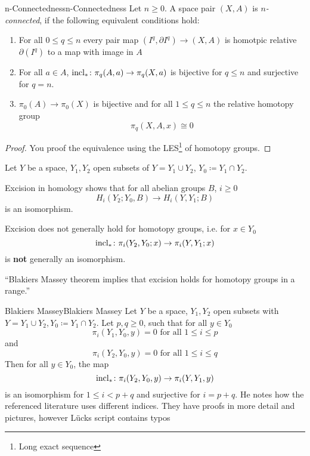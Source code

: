 \documentclass[language=english]{TemplateLecture}
\begin{document}
\begin{defi}{n-Connectedness}{n-Connectedness}
    Let \(n \geq 0\). A space pair \((X,A)\) is \emph{\(n\)-connected}, if the following equivalent conditions hold:
    \begin{enumerate}
        \item For all \(0 \leq q\leq n\) every pair map \((I^q, \partial I^q) \to (X,A)\) is homotpic relative \(\partial(I^q)\) to a map with image in \(A\)
        \item For all \(a \in A\), \(\operatorname{incl}_*\colon \pi_q(A,a) \to \pi_q(X,a)\) is bijective for \(q \leq n\) and surjective for \(q = n\).
        \item \(\pi_0(A) \to \pi_0(X)\) is bijective and for all \(1 \leq q \leq n\) the relative homotopy group
        \[\pi_q(X,A,x) \cong 0\]
    \end{enumerate}
\end{defi}

\begin{proof}
    You proof the equivalence using the LES\footnote{Long exact sequence} of homotopy groups.
\end{proof}


Let \(Y\) be a space, \(Y_1, Y_2\) open subsets of \(Y = Y_1 \cup Y_2\), \(Y_0 \coloneq Y_1\cap Y_2\).

Excision in homology shows that for all abelian groups \(B\), \(i \geq 0\)
\[H_i(Y_2; Y_0, B) \to H_i(Y,Y_1; B)\]
is an isomorphism.

Excision does not generally hold for homotopy groups, i.e. for \(x \in Y_0\)
\[\operatorname{incl}_*\colon \pi_i(Y_2, Y_0; x) \to \pi_i(Y, Y_1; x)\]
is \textbf{not} generally an isomorphism.

\enquote {Blakiers Massey theorem implies that excision holds for homotopy groups in a range.}

\begin{thm}{Blakiers Massey}{Blakiers Massey}
    Let \(Y\) be a space, \(Y_1, Y_2\) open subsets with \(Y= Y_1 \cup Y_2, Y_0 \coloneq Y_1 \cap Y_2\). Let \(p, q \geq 0\), such that for all \(y \in Y_0\)
    \[\pi_i(Y_1, Y_0, y) = 0 \text{ for all } 1 \leq i \leq p\]
    and
    \[\pi_i(Y_2, Y_0, y) = 0 \text{ for all } 1 \leq i \leq q\]
    Then for all \(y \in Y_0\), the map
    \[\operatorname{incl}_*\colon \pi_i(Y_2, Y_0, y) \to \pi_i(Y, Y_1, y)\]
    is an isomorphism for \(1 \leq i < p+q\) and surjective for \(i = p+q\). He notes how the referenced literature uses different indices. They have proofs in more detail and pictures, however Lücks script contains typos
\end{thm}
\end{document}
